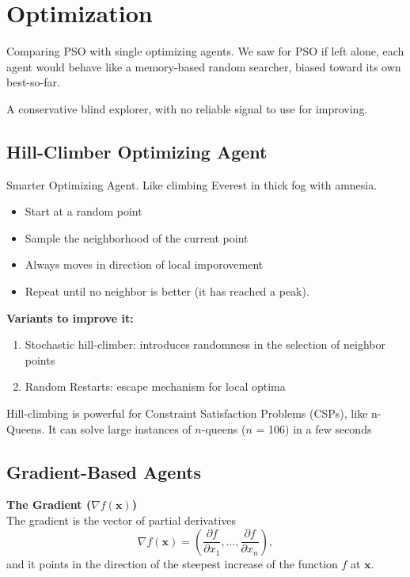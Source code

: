 \chapter*{Optimization}

Comparing PSO with single optimizing agents. We saw for PSO 
if left alone, each agent would behave like a memory-based random searcher,
biased toward its own best-so-far. 

A conservative blind explorer, with no reliable signal to use for improving.

\section*{Hill-Climber Optimizing Agent}

Smarter Optimizing Agent. Like climbing Everest in thick fog with amnesia.

\begin{itemize}
    \item Start at a random point
    \item Sample the neighborhood of the current point
    \item Always moves in direction of local imporovement
    \item Repeat until no neighbor is better (it has reached a peak).
\end{itemize}

\textbf{Variants to improve it:}
\begin{enumerate}
    \item Stochastic hill-climber: introduces randomness in the selection of neighbor points
    \item Random Restarts: escape mechanism for local optima
\end{enumerate}

Hill-climbing is powerful for Constraint Satisfaction Problems (CSPs), like n-Queens.
It can solve large instances of $n$-queens ($n$ = 106) in a few seconds

\section*{Gradient-Based Agents}

\textbf{The Gradient ($\nabla f(\mathbf{x})$)}\\
The gradient is the vector of partial derivatives 
\[
\nabla f(\mathbf{x}) = \left(\frac{\partial f}{\partial x_1}, \dots, \frac{\partial f}{\partial x_n}\right),
\] 
and it points in the direction of the steepest increase of the function $f$ at $\mathbf{x}$.

